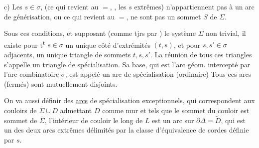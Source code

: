 c)  Les $s\in\sigma$, (ce qui revient au $=$, , les $s$ extrêmes) n'appartiennent pas à un arc de  générisation, ou ce qui revient au $=$, ne sont pas   un sommet $S$ de $\Sigma$.

Sous ces conditions, et supposant (comme tjrs par ) le système $\Sigma$ non trivial,  il existe pour t\textsuperscript{t} $s\in\sigma$ un unique côté d'extrémités $(t,s)$, et pour $s,s'\in\sigma$ adjacents, un unique triangle de  sommets $t,s,s'$. La réunion de tous ces triangles s'appelle un triangle de spécialisation. Sa base, qui est l'arc géom. intercepté par l'arc combinatoire $\sigma$, est appelé un arc de spécialisation (ordinaire)  Tous ces arcs (fermés) sont  mutuellement disjoints. 

On va aussi définir des \uline{arcs} de spécialisation exceptionnels, qui correspondent aux couloirs de $\overline\Sigma\cup D$ admettant $D$ comme mur et tels que le sommet du couloir est sommet de $\overline\Sigma$,    l'intérieur de   couloir le long de $L$ est un arc sur $\partial\Delta=\widetilde D$, qui est un des deux arcs extrêmes délimités par la classe d'équivalence de cordes définie par $s$.

